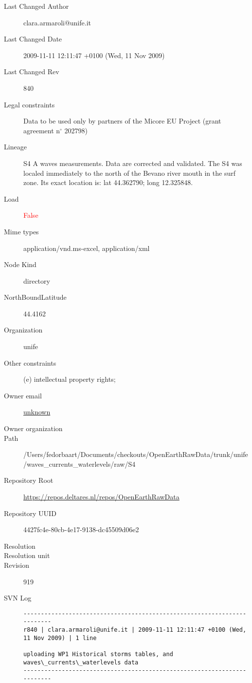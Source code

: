 \documentclass[9]{report}
\begin{document}
\begin{description}
  \item[Last Changed Author] clara.armaroli@unife.it
  \item[Last Changed Date] 2009-11-11 12:11:47 +0100 (Wed, 11 Nov 2009)
  \item[Last Changed Rev] 840
  \item[Legal constraints] Data to be used only by partners of the Micore EU Project (grant agreement n\mbox{$^\circ$} 202798)
  \item[Lineage] S4 A waves measurements. Data are corrected and validated. The S4 was localed immediately to the north of the Bevano river mouth in the surf zone. Its exact location is: lat 44.362790; long 12.325848.
  \item[Load] \textcolor{red}{False}
  \item[Mime types] application/vnd.ms-excel, application/xml
  \item[Node Kind] directory
  \item[NorthBoundLatitude] 44.4162
  \item[Organization] unife
  \item[Other constraints] (e) intellectual property rights;
  \item[Owner email] \href{mailto:unknown}{unknown}
  \item[Owner organization] 
  \item[Path] /Users/fedorbaart/Documents/checkouts/OpenEarthRawData/trunk/unife/waves\_currents\_waterlevels/raw/S4
  \item[Repository Root] \href{https://repos.deltares.nl/repos/OpenEarthRawData}{https://repos.deltares.nl/repos/OpenEarthRawData}
  \item[Repository UUID] 4427fc4e-80cb-4e17-9138-dc45509d06e2
  \item[Resolution] 
  \item[Resolution unit] 
  \item[Revision] 919
  \item[SVN Log] \begin{verbatim}
------------------------------------------------------------------------
r840 | clara.armaroli@unife.it | 2009-11-11 12:11:47 +0100 (Wed, 11 Nov 2009) | 1 line

uploading WP1 Historical storms tables, and waves\_currents\_waterlevels data
------------------------------------------------------------------------


\end{verbatim}
\end{description}
\end{document}
